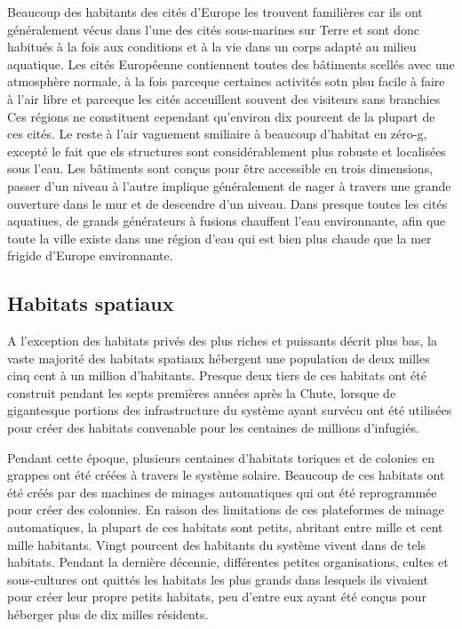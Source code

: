                Beaucoup des habitants des cités d'Europe les trouvent familières car ils ont généralement vécus dans l'une des cités sous-marines sur Terre et sont donc habitués à la fois aux conditions et à la vie dans un corps adapté au milieu aquatique. Les cités Européenne contiennent toutes des bâtiments scellés avec une atmosphère normale, à la fois parceque certaines activités sotn plsu facile à faire à l'air libre et parceque les cités acceuillent souvent des visiteurs sans branchies Ces régions ne constituent cependant qu'environ dix pourcent de la plupart de ces cités. Le reste à l'air vaguement smiliaire à beaucoup d'habitat en zéro-g, excepté le fait que els structures sont considérablement plus robuste et localisées sous l'eau. Les bâtiments sont conçus pour être accessible en trois dimensions, passer d'un niveau à l'autre implique généralement de nager à travers une grande ouverture dans le mur et de descendre d'un niveau. Dans presque toutes les cités aquatiues, de grands générateurs à fusions chauffent l'eau environnante, afin que toute la ville existe dans une région d'eau qui est bien plus chaude que la mer frigide d'Europe environnante. 

               \subsection{Habitats spatiaux} \label{sec:space-habitats} 

               A l'exception des habitats privés des plus riches et puissants décrit plus bas, la vaste majorité des habitats spatiaux hébergent une population de deux milles cinq cent à un million d'habitants. Presque deux tiers de ces habitats ont été construit pendant les septs premières années après la Chute, lorsque de gigantesque portions des infrastructure du système ayant survécu ont été utilisées pour créer des habitats convenable pour les centaines de millions d'infugiés. 

               Pendant cette époque, plusieurs centaines d'habitats toriques et de colonies en grappes ont été créées à travers le système solaire. Beaucoup de ces habitats ont été créés par des machines de minages automatiques qui ont été reprogrammée pour créer des colonnies. En raison des limitations de ces plateformes de minage automatiques, la plupart de ces habitats sont petits, abritant entre mille et cent mille habitants. Vingt pourcent des habitants du système vivent dans de tels habitats. Pendant la dernière décennie, différentes petites organisations, cultes et sous-cultures ont quittés les habitats les plus grands dans lesquels ils vivaient pour créer leur propre petits habitats, peu d'entre eux ayant été conçus pour héberger plus de dix milles résidents. 

